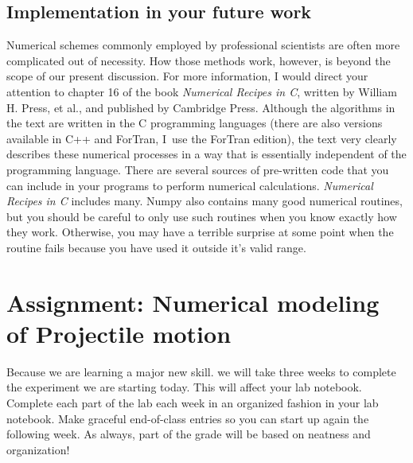 \documentclass[twoside,11pt,ShortChapTitles]{BYUTextbook}
\begin{document}
\subsection{Implementation in your future work}

Numerical schemes commonly employed by professional scientists are often more
complicated out of necessity. How those methods work, however, is beyond the
scope of our present discussion. For more information, I would direct your
attention to chapter 16 of the book \emph{Numerical Recipes in C}, written by
William H. Press, et al., and published by Cambridge Press.\cite{press92}
Although the algorithms in the text are written in the C programming languages
(there are also versions available in C++ and ForTran, I\ use the ForTran
edition), the text very clearly describes these numerical processes in a way
that is essentially independent of the programming language. There are several
sources of pre-written code that you can include in your programs to perform
numerical calculations. \emph{Numerical Recipes in C} includes many. Numpy also contains many good numerical routines, but you
should be careful to only use such routines when you know exactly how they
work. Otherwise, you may have a terrible surprise at some point when the
routine fails because you have used it outside it's valid range.



\section{Assignment: Numerical modeling of Projectile motion}

{\small Because we are learning a major new skill. we will take three weeks to
complete the experiment we are starting today. This will affect your lab
notebook. Complete each part of the lab each week in an organized fashion in
your lab notebook. Make graceful end-of-class entries so you can start up
again the following week. As always, part of the grade will be based on
neatness and organization!}
\end{document}
